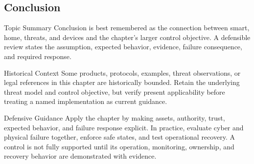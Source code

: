 \documentclass[11pt,letterpaper]{article}
\begin{document}
\subsection*{Conclusion}
\begin{CornellNotesTable}
\end{CornellNotesTable}
\begin{CornellSummaryBox}{Topic Summary}
Conclusion is best remembered as the connection between smart, home, threats, and devices and the chapter's larger control objective. A defensible review states the assumption, expected behavior, evidence, failure consequence, and required response.
\end{CornellSummaryBox}
\begin{CornellWarningBox}{Historical Context}
Some products, protocols, examples, threat observations, or legal references in this chapter are historically bounded. Retain the underlying threat model and control objective, but verify present applicability before treating a named implementation as current guidance.
\end{CornellWarningBox}
\begin{CornellOverviewBox}{Defensive Guidance}
Apply the chapter by making assets, authority, trust, expected behavior, and failure response explicit. In practice, evaluate cyber and physical failure together, enforce safe states, and test operational recovery. A control is not fully supported until its operation, monitoring, ownership, and recovery behavior are demonstrated with evidence.
\end{CornellOverviewBox}
\end{document}
